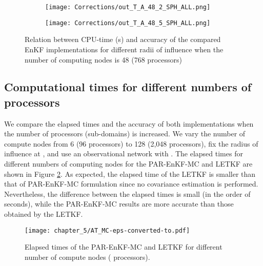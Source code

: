 \documentclass[12pt]{article}
\begin{document}
\begin{figure}[H]
\centering
\begin{subfigure}{0.5\textwidth}
\centering
\texttt{[image: Corrections/out\_T\_A\_48\_2\_SPH\_ALL.png]}
\caption{}
\end{subfigure}\begin{subfigure}{0.5\textwidth}
\centering
\texttt{[image: Corrections/out\_T\_A\_48\_5\_SPH\_ALL.png]}
\caption{}
\end{subfigure}\caption{Relation between CPU-time (s) and accuracy of the compared EnKF implementations for different radii of influence when the number of computing nodes is 48 (768 processors)}
\label{fig:all-48}
\end{figure}
\subsection{Computational times for different numbers of processors}
\label{subsec:elapsed-time-per-processor}
We compare the elapsed times and the accuracy of both implementations when the number of processors (sub-domains) is increased. We vary the number of compute nodes from 6 (96 processors) to 128 (2,048 processors), fix the radius of influence at , and use an observational network with . The elapsed times for different numbers of computing nodes for the PAR-EnKF-MC and LETKF are shown in Figure \ref{fig:elapsed-times}. As expected, the elapsed time of the LETKF is smaller than that of PAR-EnKF-MC formulation since no covariance estimation is performed. Nevertheless, the difference between the elapsed times is small (in the order of seconds), while the PAR-EnKF-MC results are more accurate than those obtained by the LETKF.
\begin{figure}[H]
\centering
\texttt{[image: chapter\_5/AT\_MC-eps-converted-to.pdf]}
\caption{Elapsed times of the PAR-EnKF-MC and LETKF for different number of compute nodes ( processors).}
\label{fig:elapsed-times}
\end{figure}
\end{document}
